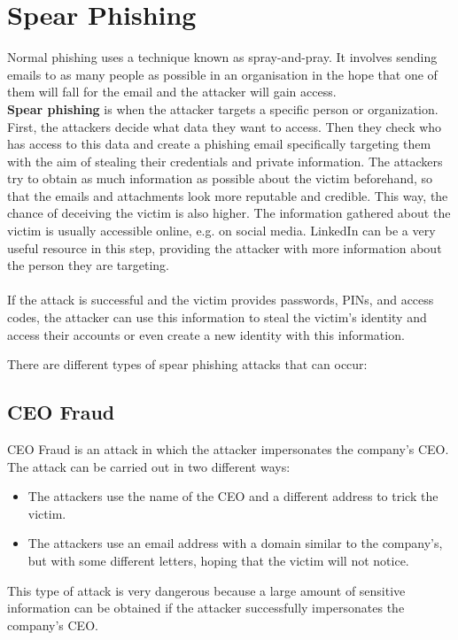 \section{Spear Phishing}
Normal phishing uses a technique known as spray-and-pray. 
It involves sending emails to as many people as possible in an organisation in the hope that one of them will fall for the email and the attacker will gain access.\\ 
\textbf{Spear phishing} is when the attacker targets a specific person or organization. 
First, the attackers decide what data they want to access. 
Then they check who has access to this data and create a phishing email specifically targeting them with the aim of stealing their credentials and private information. 
The attackers try to obtain as much information as possible about the victim beforehand, so that the emails and attachments look more reputable and credible. 
This way, the chance of deceiving the victim is also higher. 
The information gathered about the victim is usually accessible online, e.g. on social media. 
LinkedIn can be a very useful resource in this step, providing the attacker with more information about the person they are targeting. \\
\\ If the attack is successful and the victim provides passwords, PINs, and access codes, the attacker can use this information to steal the victim's identity and access their accounts or even create a new identity with this information.

There are different types of spear phishing attacks that can occur:

\subsection{CEO Fraud}
CEO Fraud is an attack in which the attacker impersonates the company's CEO. 
The attack can be carried out in two different ways:  
\begin{itemize}
    \item The attackers use the name of the CEO and a different address to trick the victim.
    \item The attackers use an email address with a domain similar to the company's, but with some different letters, hoping that the victim will not notice.
\end{itemize}
This type of attack is very dangerous because a large amount of sensitive information can be obtained if the attacker successfully impersonates the company's CEO.


